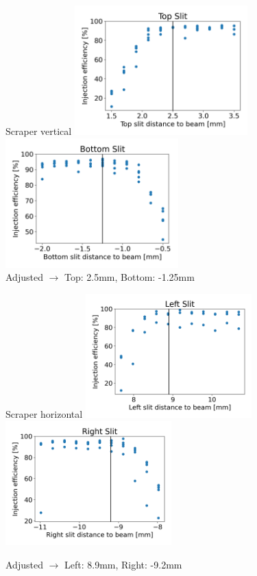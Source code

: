 \documentclass[1611]{beamer}            %
\begin{document}
\begin{frame}{Scraper vertical}
    \centering
    \includegraphics[width=0.5\textwidth]{2024-05-10/figures/Top.png}
    \includegraphics[width=0.5\textwidth]{2024-05-10/figures/Bottom.png}
    \\
    \centering
     Adjusted $\to$ Top: 2.5mm, Bottom: -1.25mm
\end{frame}

\begin{frame}{Scraper horizontal}
    \centering
    \includegraphics[width=0.48\textwidth]{2024-05-10/figures/Left.png}
    \includegraphics[width=0.48\textwidth]{2024-05-10/figures/Right.png}

     Adjusted $\to$ Left: 8.9mm, Right: -9.2mm
\end{frame}
\end{document}
